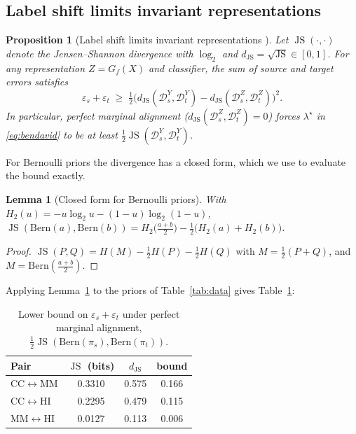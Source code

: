\documentclass[journal]{IEEEtran}
\newtheorem{proposition}{Proposition}
\newtheorem{lemma}{Lemma}
\newcommand{\1}{\mathbf{1}}
\DeclareMathOperator{\JS}{JS}
\begin{document}
\subsection{Label shift limits invariant representations}\label{sec:labelshift}
\begin{proposition}[Label shift limits invariant representations \cite{zhao2019invariant}]\label{prop:labelshift}
Let $\JS(\cdot,\cdot)$ denote the Jensen--Shannon divergence with $\log_2$ \cite{lin1991js} and $d_{\JS}=\sqrt{\JS}\in[0,1]$. For any representation $Z=G_f(X)$ and classifier, the sum of source and target errors satisfies
\begin{equation}
\varepsilon_s+\varepsilon_t\;\ge\;\tfrac12\big(d_{\JS}(\mathcal D_s^Y,\mathcal D_t^Y)-d_{\JS}(\mathcal D_s^Z,\mathcal D_t^Z)\big)^2 .
\end{equation}
In particular, perfect marginal alignment ($d_{\JS}(\mathcal D_s^Z,\mathcal D_t^Z)=0$) forces $\lambda^\star$ in \eqref{eq:bendavid} to be at least $\tfrac12\JS(\mathcal D^Y_s,\mathcal D^Y_t)$.
\end{proposition}
For Bernoulli priors the divergence has a closed form, which we use to evaluate the bound exactly.
\begin{lemma}[Closed form for Bernoulli priors]\label{lem:js}
With $H_2(u)=-u\log_2u-(1-u)\log_2(1-u)$, $\JS(\mathrm{Bern}(a),\mathrm{Bern}(b))=H_2\!\big(\tfrac{a+b}2\big)-\tfrac12\big(H_2(a)+H_2(b)\big)$.
\end{lemma}
\begin{proof}
$\JS(P,Q)=H(M)-\tfrac12H(P)-\tfrac12H(Q)$ with $M=\tfrac12(P+Q)$, and $M=\mathrm{Bern}(\tfrac{a+b}2)$. \end{proof}
\noindent Applying Lemma~\ref{lem:js} to the priors of Table~\ref{tab:data} gives Table~\ref{tab:jsbound}:
\begin{table}[h]
\centering
\caption{Lower bound on $\varepsilon_s+\varepsilon_t$ under perfect marginal alignment, $\tfrac12\JS(\mathrm{Bern}(\pi_s),\mathrm{Bern}(\pi_t))$.}
\label{tab:jsbound}
\small
\begin{tabular}{@{}lccc@{}}
\toprule
Pair & $\JS$ (bits) & $d_{\JS}$ & bound \\
\midrule
CC$\leftrightarrow$MM & 0.3310 & 0.575 & 0.166 \\
CC$\leftrightarrow$HI & 0.2295 & 0.479 & 0.115 \\
MM$\leftrightarrow$HI & 0.0127 & 0.113 & 0.006 \\
\bottomrule
\end{tabular}
\end{table}
\end{document}
